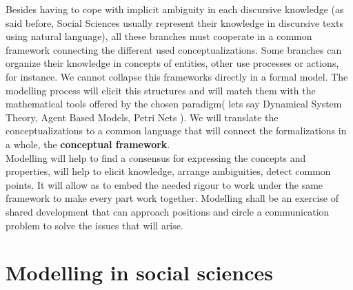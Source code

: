 \documentclass[11pt,oneside,a4paper,openright]{report}
\begin{document}
Besides having to cope with implicit ambiguity in each discursive knowledge (as said before, Social Sciences usually represent their knowledge in discursive texts using natural language), all these branches must cooperate in a common framework connecting the different used conceptualizations. Some branches can organize their knowledge in concepts of entities, other use processes or actions, for instance. We cannot collapse this frameworks directly in a formal model. The modelling process will elicit this structures and will match them with the mathematical tools offered by the chosen paradigm( lets say Dynamical System Theory, Agent Based Models, Petri Nets ). We will translate the conceptualizations to a common language that will connect the formalizations in a whole, the \textbf{conceptual framework}.\\
Modelling will help to find a consensus for expressing the concepts and properties, will help to elicit knowledge, arrange ambiguities, detect common points. It will allow as to embed the needed rigour to work under the same framework to make every part work together. Modelling shall be an exercise of shared development that can approach positions and circle a communication problem to solve the issues that will arise.



\section{Modelling in social sciences}
\label{sec:modelsinSC}


\end{document}
